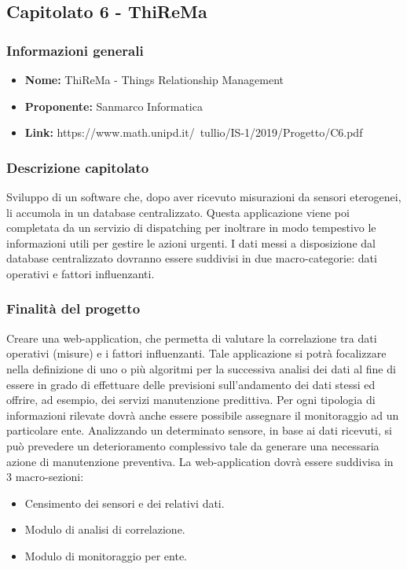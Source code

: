 \subsection{Capitolato 6 - ThiReMa}

	\subsubsection{Informazioni generali}
		\begin{itemize}
			\item \textbf{Nome:} ThiReMa - Things Relationship Management
			\item \textbf{Proponente:} Sanmarco Informatica
			\item \textbf{Link:} https://www.math.unipd.it/~tullio/IS-1/2019/Progetto/C6.pdf
		\end{itemize}

	\subsubsection{Descrizione capitolato}
		Sviluppo di un software che,  dopo aver ricevuto misurazioni da sensori eterogenei, li accumola in un database centralizzato. Questa applicazione viene poi completata da un servizio di dispatching per inoltrare in modo tempestivo le informazioni utili per gestire le azioni urgenti.
		I dati messi a disposizione dal database centralizzato dovranno essere suddivisi in due macro-categorie: dati operativi e fattori influenzanti.

	\subsubsection{Finalità del progetto}
		Creare una web-application, che permetta di valutare la correlazione tra dati operativi (misure) e i fattori influenzanti. Tale applicazione si potrà focalizzare nella definizione di uno o più algoritmi per la successiva analisi dei dati al fine di essere in grado di effettuare delle previsioni sull’andamento dei dati stessi ed offrire, ad esempio, dei servizi manutenzione predittiva.
		Per ogni tipologia di informazioni rilevate dovrà anche essere	possibile assegnare il monitoraggio ad un particolare ente. 
		Analizzando un determinato sensore, in base ai dati ricevuti, si può prevedere un deterioramento complessivo tale da generare una necessaria azione di manutenzione preventiva.
		La web-application dovrà essere suddivisa in 3 macro-sezioni:
			\begin{itemize}
				\item Censimento dei sensori e dei relativi dati.
				\item Modulo di analisi di correlazione.
				\item Modulo di monitoraggio per ente.
			\end{itemize}
		
